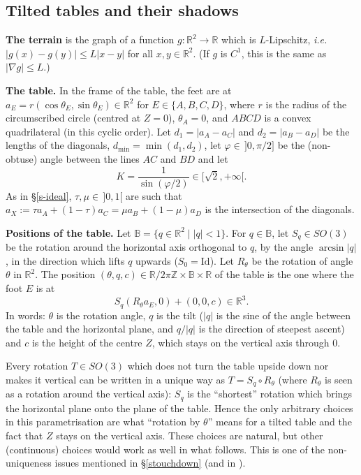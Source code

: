 \documentclass[a4paper,11pt,twoside,leqno]{article}
\newcommand{\ie}[0]{\emph{i.e.} }
\newcommand{\rr}[0]{\ensuremath{\mathbb{R}}}
\newcommand{\zz}[0]{\ensuremath{\mathbb{Z}}}
\numberwithin{equation}{section}
\begin{document}
\subsection{Tilted tables and their shadows}

\textbf{The terrain} is the graph of a function $g: \rr^2 \to \rr$ which is $L$-Lipschitz, \ie $|g(x) - g(y)| \leq L |x-y|$ for all $x,y \in \rr^2$. (If $g$ is $C^1$, this is the same as $|\nabla g| \leq L$.)

\textbf{The table.} In the frame of the table, the feet are at $a_E = r(\cos \theta_E, \sin \theta_E) \in \rr^2$ for $E \in \{A,B,C,D\}$, where $r$ is the radius of the circumscribed circle (centred at $Z = 0$), $\theta_A = 0$, and $ABCD$ is a convex quadrilateral (in this cyclic order). Let $d_1 = |a_A - a_C|$ and $d_2 = |a_B - a_D|$ be the lengths of the diagonals, $d_{\min} = \min(d_1,d_2)$, let $\varphi \in \,]0,\pi/2]$ be the (non-obtuse) angle between the lines $AC$ and $BD$ and let
\[
K = \frac{1}{\sin(\varphi/2)} \in [\sqrt{2}, +\infty[.
\]
As in \S{}\ref{s-ideal}, $\tau, \mu \in \,]0,1[$ are such that $a_X := \tau a_A + (1-\tau) a_C = \mu a_B + (1-\mu) a_D$ is the intersection of the diagonals.

\textbf{Positions of the table.} Let $\mathbb{B} = \{ q \in \rr^2 \mid |q| < 1\}$. For $q \in \mathbb{B}$, let $S_q \in SO(3)$ be the rotation around the horizontal axis orthogonal to $q$, by the angle $\arcsin |q|$, in the direction which lifts $q$ upwards ($S_0 = \mathrm{Id}$). Let $R_\theta$ be the rotation of angle $\theta$ in $\rr^2$. The position $(\theta,q,c) \in \rr/2\pi\zz \times \mathbb{B} \times \rr$ of the table is the one where the foot $E$ is at
\[
S_q (R_\theta a_E,0) + (0,0,c) \in \rr^3.
\]
In words: $\theta$ is the rotation angle, $q$ is the tilt ($|q|$ is the sine of the angle between the table and the horizontal plane, and $q/|q|$ is the direction of steepest ascent) and $c$ is the height of the centre $Z$, which stays on the vertical axis through $0$.

Every rotation $T \in SO(3)$ which does not turn the table upside down nor makes it vertical can be written in a unique way as $T = S_q \circ R_\theta$ (where $R_\theta$ is seen as a rotation around the vertical axis): $S_q$ is the ``shortest'' rotation which brings the horizontal plane onto the plane of the table. Hence the only arbitrary choices in this parametrisation are what ``rotation by $\theta$'' means for a tilted table and the fact that $Z$ stays on the vertical axis. These choices are natural, but other (continuous) choices would work as well in what follows. This is one of the non-uniqueness issues mentioned in \S{}\ref{stouchdown} (and in \cite{Mar}).
\end{document}
